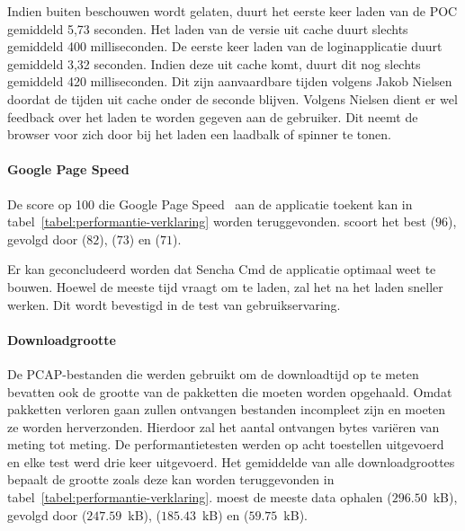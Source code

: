 
Indien \st{} buiten beschouwen wordt gelaten, duurt het eerste keer laden van de POC gemiddeld 5,73 seconden. 
Het laden van de versie uit cache duurt slechts gemiddeld 400 milliseconden.
De eerste keer laden van de loginapplicatie duurt gemiddeld 3,32 seconden.
Indien deze uit cache komt, duurt dit nog slechts gemiddeld 420 milliseconden.
Dit zijn aanvaardbare tijden volgens Jakob Nielsen~\cite{Nielsen1993} doordat de tijden uit cache onder de seconde blijven.
Volgens Nielsen dient er wel feedback over het laden te worden gegeven aan de gebruiker.
Dit neemt de browser voor zich door bij het laden een laadbalk of spinner te tonen.


\paragraph{Google Page Speed}
De score op 100 die Google Page Speed~\cite{Morgan2011} aan de applicatie toekent kan in tabel~\ref{tabel:performantie-verklaring} worden teruggevonden.
\st{} scoort het best ($96$),  gevolgd door \lungo{} ($82$),  \kendo{}($73$) en \jqm{}($71$).

Er kan geconcludeerd worden dat Sencha Cmd de applicatie optimaal weet te bouwen.
Hoewel \st{} de meeste tijd vraagt om te laden, zal het na het laden sneller werken.
Dit wordt bevestigd in de test van gebruikservaring.


\paragraph{Downloadgrootte}
De PCAP-bestanden die werden gebruikt om de downloadtijd op te meten bevatten ook de grootte van de pakketten die moeten worden opgehaald.
Omdat pakketten verloren gaan zullen ontvangen bestanden incompleet zijn en moeten ze worden herverzonden.
Hierdoor zal het aantal ontvangen bytes variëren van meting tot meting.
De performantietesten werden op acht toestellen uitgevoerd en elke test werd drie keer uitgevoerd.
Het gemiddelde van alle downloadgroottes bepaalt de grootte zoals deze kan worden teruggevonden in tabel~\ref{tabel:performantie-verklaring}.
\kendo{} moest de meeste data ophalen ($296.50$~kB),  gevolgd door \st{} ($247.59$~kB), \jqm{} ($185.43$~kB) en \lungo{} ($59.75$~kB).

